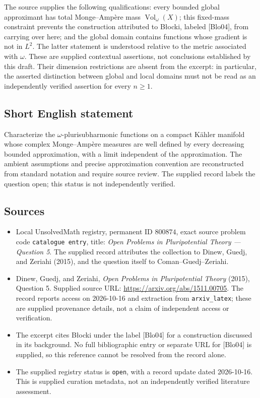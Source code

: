 \documentclass[11pt]{article}
\begin{document}
The source supplies the following qualifications: every bounded global approximant has total Monge--Amp\`ere mass \(\operatorname{Vol}_{\omega}(X)\); this fixed-mass constraint prevents the construction attributed to B\l{}ocki, labeled [Blo04], from carrying over here; and the global domain contains functions whose gradient is not in \(L^2\). The latter statement is understood relative to the metric associated with \(\omega\). These are supplied contextual assertions, not conclusions established by this draft. Their dimension restrictions are absent from the excerpt: in particular, the asserted distinction between global and local domains must not be read as an independently verified assertion for every \(n\geq1\).
\subsection{Short English statement}
Characterize the \(\omega\)-plurisubharmonic functions on a compact K\"ahler manifold whose complex Monge--Amp\`ere measures are well defined by every decreasing bounded approximation, with a limit independent of the approximation. The ambient assumptions and precise approximation convention are reconstructed from standard notation and require source review. The supplied record labels the question open; this status is not independently verified.
\subsection{Sources}
\begin{itemize}
\item Local UnsolvedMath registry, permanent ID \(800874\), exact source problem code \texttt{catalogue entry}, title: \emph{Open Problems in Pluripotential Theory --- Question 5}. The supplied record attributes the collection to Dinew, Guedj, and Zeriahi (2015), and the question itself to Coman--Guedj--Zeriahi.
\item Dinew, Guedj, and Zeriahi, \emph{Open Problems in Pluripotential Theory} (2015), Question 5. Supplied source URL: \url{https://arxiv.org/abs/1511.00705}. The record reports access on 2026-10-16 and extraction from \texttt{arxiv\_latex}; these are supplied provenance details, not a claim of independent access or verification.
\item The excerpt cites B\l{}ocki under the label [Blo04] for a construction discussed in its background. No full bibliographic entry or separate URL for [Blo04] is supplied, so this reference cannot be resolved from the record alone.
\item The supplied registry status is \texttt{open}, with a record update dated 2026-10-16. This is supplied curation metadata, not an independently verified literature assessment.
\end{itemize}
\end{document}
